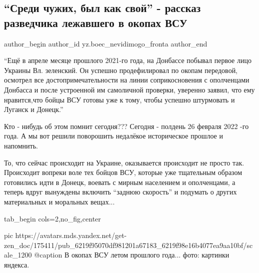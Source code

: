  
 
 
 
 
 
\subsection{\enquote{Среди чужих, был как свой} - рассказ разведчика лежавшего в окопах ВСУ}
\label{sec:26_02_2022.yz.boec_nevidimogo_fronta.1.sredi_chuzhyh_razvedchik_vsu}
 
\ifcmt
 author_begin
   author_id yz.boec_nevidimogo_fronta
 author_end
\fi

\enquote{Ещё в апреле месяце прошлого 2021-го года, на Донбассе побывал первое лицо
Украины Вл. зеленский. Он успешно продефилировал по окопам передовой, осмотрел
все достопримечательности на линии соприкосновения с ополченцами Донбасса и
после устроенной им самоличной проверки, уверенно заявил, что ему нравится,что
бойцы ВСУ готовы уже к тому, чтобы успешно штурмовать и Луганск и Донецк.}

\begin{zznagolos}
Кто - нибудь об этом помнит сегодня??? Сегодня - полдень 26 февраля 2022 -го
года. А мы вот решили поворошить недалёкое историческое прошлое и напомнить.	
\end{zznagolos}

То, что сейчас происходит на Украине, оказывается происходит не просто так.
Происходит вопреки воле тех бойцов ВСУ, которые уже тщательным образом
готовились идти в Донецк, воевать с мирным населением и ополченцами, а теперь
вдруг вынуждены включить \enquote{заднюю скорость} и подумать о других
материальных и моральных вещах...

\ifcmt
  tab_begin cols=2,no_fig,center

     pic https://avatars.mds.yandex.net/get-zen_doc/175411/pub_6219f95070df981201a67183_6219f98e16b4077ea9aa10bf/scale_1200
		 @caption В окопах ВСУ летом прошлого года... фото: картинки яндекса.

